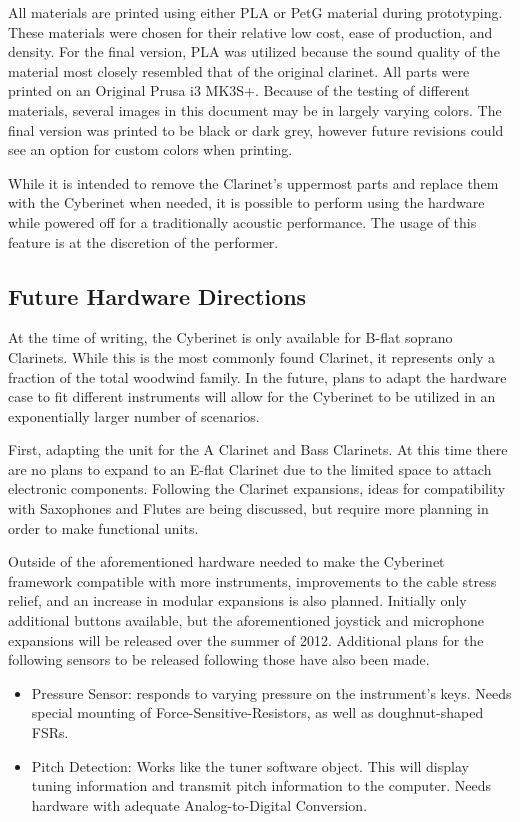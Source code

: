 All materials are printed using either PLA or PetG material during prototyping. These materials were chosen for their relative low cost, ease of production, and density. For the final version, PLA was utilized because the sound quality of the material most closely resembled that of the original clarinet. All parts were printed on an Original Prusa i3 MK3S+. Because of the testing of different materials, several images in this document may be in largely varying colors. The final version was printed to be black or dark grey, however future revisions could see an option for custom colors when printing. 

While it is intended to remove the Clarinet's uppermost parts and replace them with the Cyberinet when needed, it is possible to perform using the hardware while powered off for a traditionally acoustic performance. The usage of this feature is at the discretion of the performer.

\subsection{Future Hardware Directions}
At the time of writing, the Cyberinet is only available for B-flat soprano Clarinets. While this is the most commonly found Clarinet, it represents only a fraction of the total woodwind family. In the future, plans to adapt the hardware case to fit different instruments will allow for the Cyberinet to be utilized in an exponentially larger number of scenarios. 

First, adapting the unit for the A Clarinet and Bass Clarinets. At this time there are no plans to expand to an E-flat Clarinet due to the limited space to attach electronic components. Following the Clarinet expansions, ideas for compatibility with Saxophones and Flutes are being discussed, but require more planning in order to make functional units.

Outside of the aforementioned hardware needed to make the Cyberinet framework compatible with more instruments, improvements to the cable stress relief, and an increase in modular expansions is also planned. Initially only additional buttons available, but the aforementioned joystick and microphone expansions will be released over the summer of 2012. Additional plans for the following sensors to be released following those have also been made.

\begin{itemize}
    \item Pressure Sensor: responds to varying pressure on the instrument's keys. Needs special mounting of Force-Sensitive-Resistors, as well as doughnut-shaped FSRs.
    \item Pitch Detection: Works like the tuner software object. This will display tuning information and transmit pitch information to the computer. Needs hardware with adequate Analog-to-Digital Conversion.
\end{itemize}

